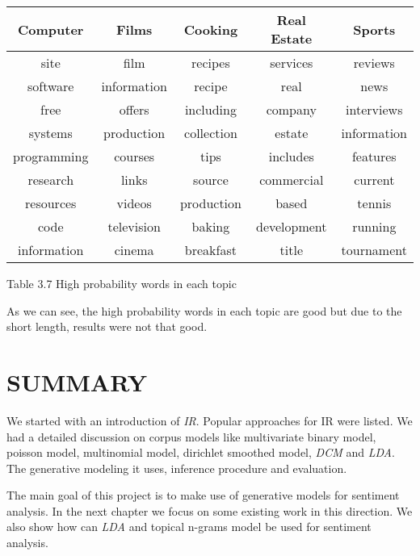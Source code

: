 \begin{center}
\begin{tabular}{ |c|c|c|c|c| }
  \hline \hline
  Computer & Films & Cooking & Real Estate & Sports \\ \hline \hline
  site & film &	recipes & services & reviews \\ \hline
  software & information & recipe & real & news \\ \hline
  free & offers & including & company &	interviews\\ \hline
  systems & production & collection & estate & information \\ \hline
  programming & courses & tips & includes & features \\ \hline
  research & links & source & commercial & current \\ \hline
  resources & videos & production & based & tennis \\ \hline
  code & television & baking & development & running \\ \hline
  information &	cinema & breakfast & title & tournament \\ \hline
\end{tabular}
\end{center}
\begin{center}
 Table 3.7 High probability words in each topic 
\end{center}

As we can see, the high probability words in each topic are good but due to the short length, results were not that good. 

\section*{SUMMARY}

We started with an introduction of \textit{IR}. Popular approaches for IR were listed. We had a detailed discussion on corpus models like
multivariate binary model, poisson model, multinomial model, dirichlet smoothed model, \textit{DCM} and \textit{LDA}. The generative modeling 
it uses, inference procedure and evaluation. 

The main goal of this project is to make use of generative models for sentiment analysis. In the next chapter we focus on some existing work 
in this direction. We also show how can \textit{LDA} and topical n-grams model be used for sentiment analysis.

\clearpage
